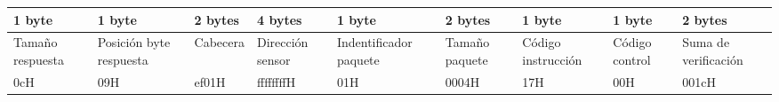 \tiny
\begin{tabular}{|C{1.2cm}|C{1.4cm}|C{1.2cm}|C{1.2cm}|C{1.4cm}|C{1.2cm}|C{1.2cm}|C{1.2cm}|C{1.4cm}|}
   byte & 1 byte & 2 bytes & 4 bytes & 1 byte & 2 bytes & 1 byte & 1 byte & 2 bytes \\
  \hline
  Tamaño respuesta & Posición byte respuesta & Cabecera & Dirección sensor & Indentificador paquete & Tamaño paquete & Código instrucción & Código control & Suma de verificación \\
  \hline
  0cH & 09H & ef01H & ffffffffH & 01H & 0004H & 17H & 00H & 001cH \\
  \hline
\end{tabular}